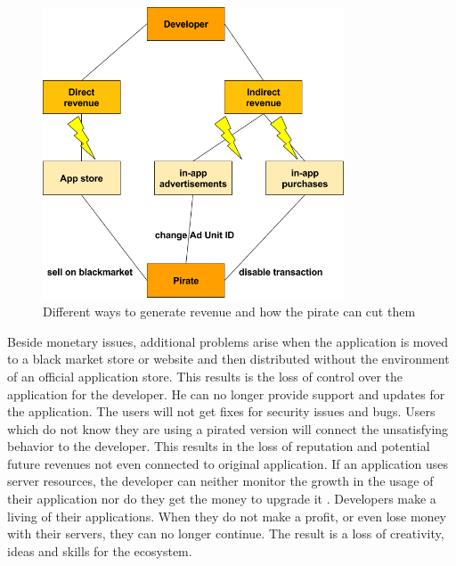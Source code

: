 \begin{figure}[h]
    \centering
    \includegraphics[width=0.8\textwidth]{data/revenue.png}
    \caption{Different ways to generate revenue and how the pirate can cut them}
    \label{fig:revenue}
\end{figure}
\newline
Beside monetary issues, additional problems arise when the application is moved to a black market store or website and then distributed without the environment of an official application store.
This results is the loss of control over the application for the developer.
He can no longer provide support and updates for the application.
The users will not get fixes for security issues and bugs.
Users which do not know they are using a pirated version will connect the unsatisfying behavior to the developer.
This results in the loss of reputation and potential future revenues not even connected to original application.
\newline
If an application uses server resources, the developer can neither monitor the growth in the usage of their application nor do they get the money to upgrade it \cite{lierschDeveloperThreats}.
\newline
Developers make a living of their applications.
When they do not make a profit, or even lose money with their servers, they can no longer continue.
The result is a loss of creativity, ideas and skills for the ecosystem.
